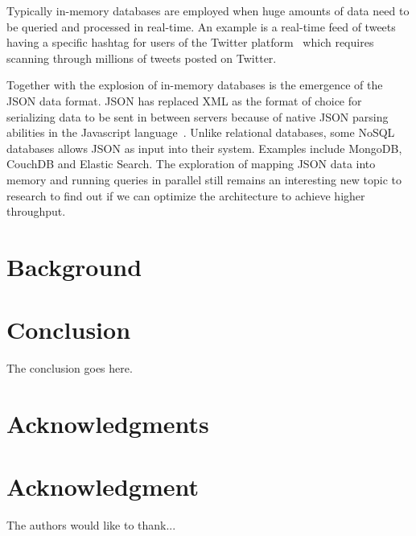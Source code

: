 \documentclass[11pt,journal,compsoc]{IEEEtran}
\begin{document}
Typically in-memory databases are employed when huge amounts of data need to be
queried and processed in real-time. An example is a real-time feed of tweets
having a specific hashtag for users of the Twitter platform~\cite{twitter}
which requires scanning through millions of tweets posted on Twitter.

Together with the explosion of in-memory databases is the emergence of the JSON
data format. JSON has replaced XML as the format of choice for serializing data
to be sent in between servers because of native JSON parsing abilities in the
Javascript language~\cite{json}. Unlike relational
databases, some NoSQL databases allows JSON as input into their system. Examples
include MongoDB, CouchDB and Elastic Search. The exploration of mapping JSON
data into memory and running queries in parallel still remains an interesting
new topic to research to find out if we can optimize the architecture to achieve
higher throughput.

\section{Background}


\section{Conclusion}
The conclusion goes here.

\ifCLASSOPTIONcompsoc
  \section*{Acknowledgments}
\else
  \section*{Acknowledgment}
\fi

The authors would like to thank...

\ifCLASSOPTIONcaptionsoff
  \newpage
\fi




%
%
%




\end{document}
